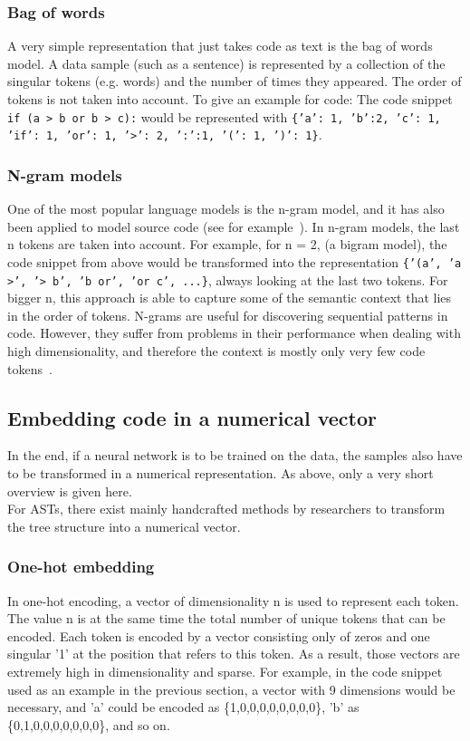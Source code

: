 \documentclass[
a4paper,
pagesize,
pdftex,
12pt,
twoside, %
BCOR=5mm, %
ngerman,
fleqn,
final,
]{scrartcl}
\begin{document}
	\subsubsection{Bag of words}\label{bag-of-words}
	A very simple representation that just takes code as text is the bag of words model. A data sample (such as a sentence) is represented by a collection of the singular tokens (e.g. words) and the number of times they appeared. The order of tokens is not taken into account. To give an example for code: The code snippet \texttt{if (a > b or b > c):} would be represented with \texttt{\{'a': 1, 'b':2, 'c': 1, 'if': 1, 'or': 1, '>': 2, ':':1, '(': 1, ')': 1\}}.
	
	\subsubsection{N-gram models}\label{n-gram}
	One of the most popular language models is the n-gram model, and it has also been applied to model source code (see for example~\cite{Pang.2015}). In n-gram models, the last n tokens are taken into account. For example, for n = 2, (a bigram model), the code snippet from above would be transformed into the representation \texttt{\{'(a', 'a >', '> b', 'b or', 'or c', ...\}}, always looking at the last two tokens. For bigger n, this approach is able to capture some of the semantic context that lies in the order of tokens. N-grams are useful for discovering sequential patterns in code. However, they suffer from problems in their performance when dealing with high dimensionality, and therefore the context is mostly only very few code tokens~\cite{Dam.2016}.
	
	
	\subsection{Embedding code in a numerical vector}
	In the end, if a neural network is to be trained on the data, the samples also have to be transformed in a numerical representation. As above, only a very short overview is given here.\\
	For ASTs, there exist mainly handcrafted methods by researchers to transform the tree structure into a numerical vector.
	
	\subsubsection{One-hot embedding}\label{one-hot}
	In one-hot encoding, a vector of dimensionality n is used to represent each token. The value n is at the same time the total number of unique tokens that can be encoded. Each token is encoded by a vector consisting only of zeros and one singular '1' at the position that refers to this token. As a result, those vectors are extremely high in dimensionality and sparse. For example, in the code snippet used as an example in the previous section, a vector with 9 dimensions would be necessary, and 'a' could be encoded as \{1,0,0,0,0,0,0,0,0\}, 'b' as \{0,1,0,0,0,0,0,0,0\}, and so on.
	
\end{document}
